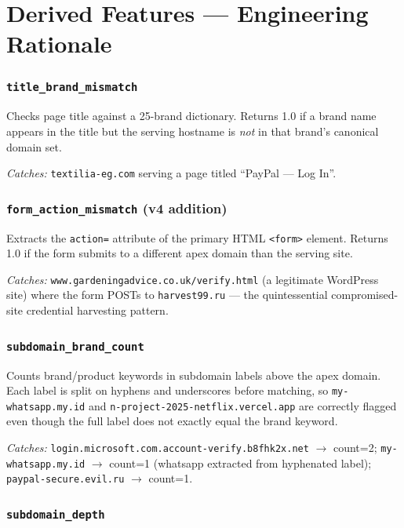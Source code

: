 \documentclass[11pt,a4paper]{article}
\newcommand{\code}[1]{\texttt{#1}}
\begin{document}
\section{Derived Features --- Engineering Rationale}

\subsubsection*{\code{title\_brand\_mismatch}}

Checks page title against a 25-brand dictionary. Returns 1.0 if a
brand name appears in the title but the serving hostname is \emph{not}
in that brand's canonical domain set.

\textit{Catches:} \code{textilia-eg.com} serving a page titled
``PayPal --- Log In''.

\subsubsection*{\code{form\_action\_mismatch} (v4 addition)}

Extracts the \code{action=} attribute of the primary HTML
\code{<form>} element. Returns 1.0 if the form submits to a different
apex domain than the serving site.

\textit{Catches:} \code{www.gardeningadvice.co.uk/verify.html} (a
legitimate WordPress site) where the form POSTs to
\code{harvest99.ru} --- the quintessential compromised-site credential
harvesting pattern.

\subsubsection*{\code{subdomain\_brand\_count}}

Counts brand/product keywords in subdomain labels above the apex
domain. Each label is split on hyphens and underscores before matching,
so \code{my-whatsapp.my.id} and
\code{n-project-2025-netflix.vercel.app} are correctly flagged even
though the full label does not exactly equal the brand keyword.

\textit{Catches:}
\code{login.microsoft.com.account-verify.b8fhk2x.net} $\rightarrow$
count=2;
\code{my-whatsapp.my.id} $\rightarrow$ count=1 (whatsapp extracted
from hyphenated label);
\code{paypal-secure.evil.ru} $\rightarrow$ count=1.

\subsubsection*{\code{subdomain\_depth}}
\end{document}
